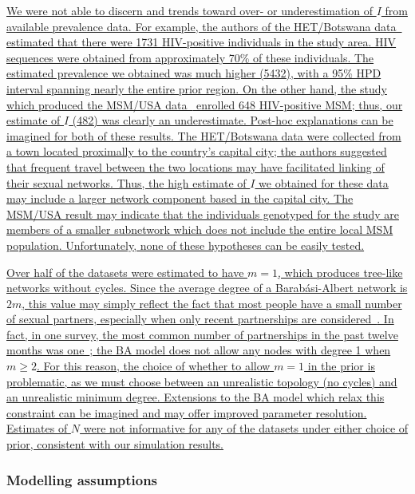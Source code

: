 \documentclass[12pt]{article}\usepackage[]{graphicx}\usepackage[]{color}
\newcommand{\add}[1]{\color{blue} \uline{#1} \color{black}}
\begin{document}
\add{We were not able to discern and trends toward over- or underestimation of
$I$ from available prevalence data. For example, the authors of the
HET/Botswana data~\autocite{novitsky2013phylogenetic, novitsky2014impact}
estimated that there were 1731 HIV-positive individuals in the study
area. HIV sequences were obtained from approximately 70\% of these individuals.
The estimated prevalence we obtained was much higher 
    (5432),
with a 95\% HPD interval spanning nearly the entire prior region. On the other
hand, the study which produced the MSM/USA data~\autocite{little2014using}
enrolled 648 HIV-positive MSM; thus, our estimate of $I$
    (482)
was clearly an underestimate. Post-hoc explanations can be imagined for both of
these results. The HET/Botswana data were collected from a town located
proximally to the country's capital city; the authors suggested that frequent
travel between the two locations may have facilitated linking of their sexual
networks. Thus, the high estimate of $I$ we obtained for these data may
include a larger network component based in the capital city. The MSM/USA
result may indicate that the individuals genotyped for the study are members of
a smaller subnetwork which does not include the entire local MSM population.
Unfortunately, none of these hypotheses can be easily tested.}

\add{Over half of the datasets were estimated to have $m = 1$, which produces
tree-like networks without cycles. Since the average degree of a
Barab\'asi-Albert network is $2m$, this value may simply reflect the fact that
most people have a small number of sexual partners, especially when only
recent partnerships are considered~\autocite{liljeros2001web}. In fact, in one
survey, the most common number of partnerships in the past twelve months was
one~\autocite{liljeros2001web}; the BA model does not allow any nodes with
degree 1 when $m \geq 2$. For this reason, the choice of whether to allow $m =
1$ in the prior is problematic, as we must choose between an unrealistic
topology (no cycles) and an unrealistic minimum degree. Extensions to the BA
model which relax this constraint can be imagined and may offer improved
parameter resolution. Estimates of $N$ were not informative for any of the
datasets under either choice of prior, consistent with our simulation results.}

\subsubsection*{Modelling assumptions}
\end{document}
